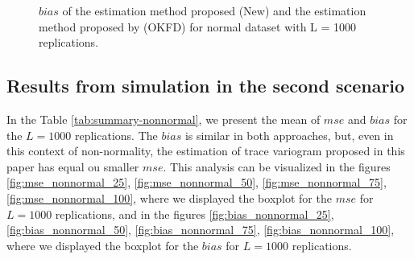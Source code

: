 \documentclass[]{interact}
\theoremstyle{plain}%
\theoremstyle{definition}
\theoremstyle{remark}
\begin{document}
\begin{figure}[htbp]
  \caption{$bias$ of the estimation method proposed (New) and the estimation method proposed by \cite{giraldo2011ordinary} (OKFD) for normal dataset with L = 1000 replications.}
\end{figure}

\hypertarget{results-from-simulation-in-the-second-scenario}{%
\subsection*{Results from simulation in the second scenario}\label{results-from-simulation-in-the-second-scenario}}

In the Table \ref{tab:summary-nonnormal}, we present the mean of \(mse\) and \(bias\) for the \(L=1000\) replications. The \(bias\) is similar in both approaches, but, even in this context of non-normality, the estimation of trace variogram proposed in this paper has equal ou smaller \(mse\).
This analysis can be visualized in the figures \ref{fig:mse_nonnormal_25}, \ref{fig:mse_nonnormal_50}, \ref{fig:mse_nonnormal_75}, \ref{fig:mse_nonnormal_100}, where we displayed the boxplot for the \(mse\) for \(L=1000\) replications, and in the figures \ref{fig:bias_nonnormal_25}, \ref{fig:bias_nonnormal_50}, \ref{fig:bias_nonnormal_75}, \ref{fig:bias_nonnormal_100}, where we displayed the boxplot for the \(bias\) for \(L=1000\) replications.
\end{document}
